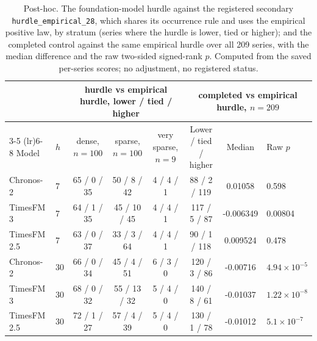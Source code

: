 \begin{table}[htbp]
\centering\footnotesize\setlength{\tabcolsep}{3.5pt}
\caption{Post-hoc. The foundation-model hurdle against the registered secondary
\texttt{hurdle\_empirical\_28}, which shares its occurrence rule and uses the empirical positive law, by
stratum (series where the hurdle is lower, tied or higher); and the completed control against the same
empirical hurdle over all 209 series, with the median difference and the raw two-sided signed-rank $p$.
Computed from the saved per-series scores; no adjustment, no registered status.}
\label{tab:s2empirical}
\begin{tabular}{llcccccl}
\toprule
 & & \multicolumn{3}{c}{hurdle vs empirical hurdle, lower / tied / higher} & \multicolumn{3}{c}{completed vs empirical hurdle, $n = 209$} \\
\cmidrule(lr){3-5} \cmidrule(lr){6-8}
Model & $h$ & dense, $n = 100$ & sparse, $n = 100$ & very sparse, $n = 9$ & Lower / tied / higher & Median & Raw $p$ \\
\midrule
Chronos-2 & 7 & 65 / 0 / 35 & 50 / 8 / 42 & 4 / 4 / 1 & 88 / 2 / 119 & 0.01058 & 0.598 \\
TimesFM 3 & 7 & 64 / 1 / 35 & 45 / 10 / 45 & 4 / 4 / 1 & 117 / 5 / 87 & -0.006349 & 0.00804 \\
TimesFM 2.5 & 7 & 63 / 0 / 37 & 33 / 3 / 64 & 4 / 4 / 1 & 90 / 1 / 118 & 0.009524 & 0.478 \\
Chronos-2 & 30 & 66 / 0 / 34 & 45 / 4 / 51 & 6 / 3 / 0 & 120 / 3 / 86 & -0.00716 & $4.94 \times 10^{-5}$ \\
TimesFM 3 & 30 & 68 / 0 / 32 & 55 / 13 / 32 & 5 / 4 / 0 & 140 / 8 / 61 & -0.01037 & $1.22 \times 10^{-8}$ \\
TimesFM 2.5 & 30 & 72 / 1 / 27 & 57 / 4 / 39 & 5 / 4 / 0 & 130 / 1 / 78 & -0.01012 & $5.1 \times 10^{-7}$ \\
\bottomrule
\end{tabular}
\end{table}

